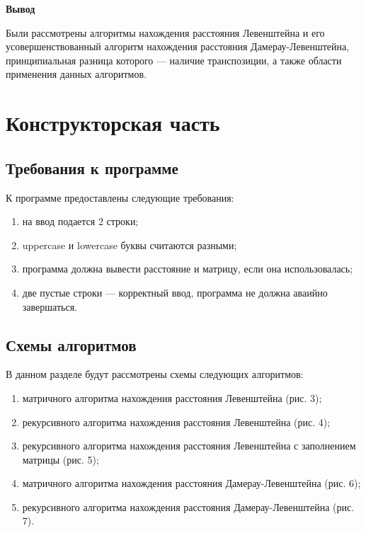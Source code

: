 \documentclass[a4paper,12pt]{article}
\begin{document}
\textbf{Вывод}

Были рассмотрены алгоритмы нахождения расстояния Левенштейна и его усовершенствованный алгоритм нахождения расстояния Дамерау-Левенштейна, принципиальная разница которого — наличие транспозиции, а также области применения данных алгоритмов.

\clearpage

\section{Конструкторская часть}%
\vspace{\baselineskip}

\subsection{Требования к программе}%

К программе предоставлены следующие требования:

\begin{enumerate}
	\item на ввод подается 2 строки;
	\item uppercase и lowercase буквы считаются разными;
	\item программа должна вывести расстояние и матрицу, если она использовалась;
	\item две пустые строки — корректный ввод, программа не должна аваийно завершаться.
\end{enumerate}

\subsection{Схемы алгоритмов}%

В данном разделе будут рассмотрены схемы следующих алгоритмов:
\begin{enumerate}
	\item матричного алгоритма нахождения расстояния Левенштейна (рис. 3);
	\item рекурсивного алгоритма нахождения расстояния Левенштейна (рис. 4);
	\item рекурсивного алгоритма нахождения расстояния Левенштейна с заполнением матрицы (рис. 5);
	\item матричного алгоритма нахождения расстояния Дамерау-Левенштейна (рис. 6);
	\item рекурсивного алгоритма нахождения расстояния Дамерау-Левенштейна (рис. 7).
\end{enumerate}
\end{document}
